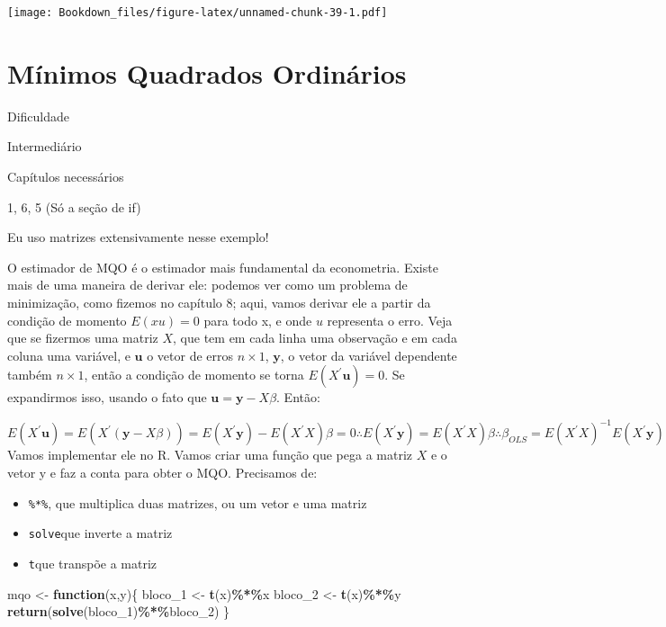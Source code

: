 \documentclass[
]{book}
\newenvironment{Shaded}{\begin{snugshade}}{\end{snugshade}}
\newcommand{\ControlFlowTok}[1]{\textcolor[rgb]{0.13,0.29,0.53}{\textbf{#1}}}
\newcommand{\DecValTok}[1]{\textcolor[rgb]{0.00,0.00,0.81}{#1}}
\newcommand{\KeywordTok}[1]{\textcolor[rgb]{0.13,0.29,0.53}{\textbf{#1}}}
\newcommand{\NormalTok}[1]{#1}
\newcommand{\OperatorTok}[1]{\textcolor[rgb]{0.81,0.36,0.00}{\textbf{#1}}}
\newcommand{\StringTok}[1]{\textcolor[rgb]{0.31,0.60,0.02}{#1}}
\providecommand{\tightlist}{%
  \setlength{\itemsep}{0pt}\setlength{\parskip}{0pt}}
\begin{document}
\texttt{[image: Bookdown\_files/figure-latex/unnamed-chunk-39-1.pdf]}

\hypertarget{muxednimos-quadrados-ordinuxe1rios}{%
\section{Mínimos Quadrados Ordinários}\label{muxednimos-quadrados-ordinuxe1rios}}

Dificuldade

Intermediário

Capítulos necessários

1, 6, 5 (Só a seção de if)

Eu uso matrizes extensivamente nesse exemplo!

O estimador de MQO é o estimador mais fundamental da econometria. Existe mais de uma maneira de derivar ele: podemos ver como um problema de minimização, como fizemos no capítulo 8; aqui, vamos derivar ele a partir da condição de momento \(E(xu) = 0\) para todo x, e onde \(u\) representa o erro. Veja que se fizermos uma matriz \(X\), que tem em cada linha uma observação e em cada coluna uma variável, e \(\mathbf{u}\) o vetor de erros \(n \times{} 1\), \(\mathbf{y}\), o vetor da variável dependente também \(n \times{} 1\), então a condição de momento se torna \(E(X^{'}\mathbf{u})=0\). Se expandirmos isso, usando o fato que \(\mathbf{u} = \mathbf{y}-X\beta\). Então:

\[E(X^{'}\mathbf{u})=E(X^{'}(\mathbf{y}-X\beta))=E(X^{'}\mathbf{y})-E(X^{'}X)\beta = 0 \therefore E(X^{'}\mathbf{y})=E(X^{'}X)\beta \therefore \beta_{OLS} = E(X^{'}X)^{-1}E(X^{'}\mathbf{y})\]
Vamos implementar ele no R. Vamos criar uma função que pega a matriz \(X\) e o vetor y e faz a conta para obter o MQO. Precisamos de:

\begin{itemize}
\tightlist
\item
  \texttt{\%*\%}, que multiplica duas matrizes, ou um vetor e uma matriz
\item
  \texttt{solve}que inverte a matriz
\item
  \texttt{t}que transpõe a matriz
\end{itemize}

\begin{Shaded}
\begin{Highlighting}[]
\NormalTok{mqo \textless{}{-}}\StringTok{ }\ControlFlowTok{function}\NormalTok{(x,y)\{}
\NormalTok{  bloco\_}\DecValTok{1}\NormalTok{ \textless{}{-}}\StringTok{ }\KeywordTok{t}\NormalTok{(x)}\OperatorTok{\%*\%}\NormalTok{x}
\NormalTok{  bloco\_}\DecValTok{2}\NormalTok{ \textless{}{-}}\StringTok{ }\KeywordTok{t}\NormalTok{(x)}\OperatorTok{\%*\%}\NormalTok{y}
  \KeywordTok{return}\NormalTok{(}\KeywordTok{solve}\NormalTok{(bloco\_}\DecValTok{1}\NormalTok{)}\OperatorTok{\%*\%}\NormalTok{bloco\_}\DecValTok{2}\NormalTok{)}
\NormalTok{\}}
\end{Highlighting}
\end{Shaded}
\end{document}
